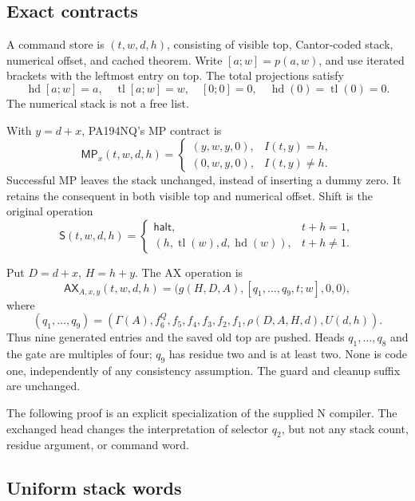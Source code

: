 \documentclass[10pt,letterpaper]{article}
\newcommand{\AX}{\mathsf{AX}}
\newcommand{\MP}{\mathsf{MP}}
\newcommand{\Sh}{\mathsf S}
\begin{document}
\subsection{Exact contracts}

A command store is \((t,w,d,h)\), consisting of visible top, Cantor-coded
stack, numerical offset, and cached theorem. Write \([a;w]=p(a,w)\), and
use iterated brackets with the leftmost entry on top. The total projections
satisfy
\[
 \operatorname{hd}[a;w]=a,\quad \operatorname{tl}[a;w]=w,
 \quad [0;0]=0,\quad \operatorname{hd}(0)=\operatorname{tl}(0)=0.
\]
The numerical stack is not a free list.

With \(y=d+x\), PA194NQ's MP contract is
\begin{equation}\label{eq:mp}
 \MP_x(t,w,d,h)=
 \begin{cases}
 (y,w,y,0),&I(t,y)=h,\\
 (0,w,y,0),&I(t,y)\ne h.
 \end{cases}
\end{equation}
Successful MP leaves the stack unchanged, instead of inserting a dummy
zero. It retains the consequent in both visible top and numerical offset.
Shift is the original operation
\begin{equation}\label{eq:shift}
 \Sh(t,w,d,h)=
 \begin{cases}
 \mathsf{halt},&t+h=1,\\
 (h,\operatorname{tl}(w),d,\operatorname{hd}(w)),&t+h\ne1.
 \end{cases}
\end{equation}

Put \(D=d+x\), \(H=h+y\). The AX operation is
\begin{equation}\label{eq:ax}
 \AX_{A,x,y}(t,w,d,h)
 =\bigl(g(H,D,A),[q_1,\ldots,q_9,t;w],0,0\bigr),
\end{equation}
where
\[
 (q_1,\ldots,q_9)
 =(\Gamma(A),f_6^Q,f_5,f_4,f_3,f_2,f_1,
                 \rho(D,A,H,d),U(d,h)).
\]
Thus nine generated entries and the saved old top are pushed. Heads
\(q_1,\ldots,q_8\) and the gate are multiples of four; \(q_9\) has residue
two and is at least two. None is code one, independently of any consistency
assumption. The guard and cleanup suffix are unchanged.

The following proof is an explicit specialization of the supplied N
compiler. The exchanged head changes the interpretation of selector
\(q_2\), but not any stack count, residue argument, or command word.

\subsection{Uniform stack words}
\end{document}
